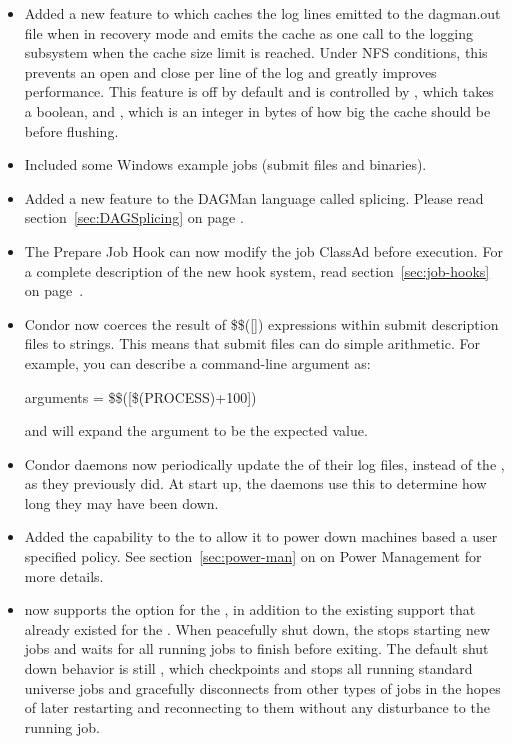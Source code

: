 \begin{itemize}

\item Added a new feature to  which caches the log lines
emitted to the dagman.out file when in recovery mode and emits the
cache as one call to the logging subsystem when the cache size limit is
reached. Under NFS conditions, this prevents an open and close per line
of the log and greatly improves performance. This feature is off by
default and is controlled by , which
takes a boolean, and  , which is an
integer in bytes of how big the cache should be before flushing.

\item Included some Windows example jobs (submit files and binaries).

\item Added a new feature to the DAGMan language called splicing. Please
read section~\ref{sec:DAGSplicing} on page \pageref{sec:DAGSplicing}.

\item The Prepare Job Hook can now modify the job ClassAd before execution.
For a complete description of the new hook system, read
section~\ref{sec:job-hooks} on page~\pageref{sec:job-hooks}.

\item Condor now coerces the result of \$\$([]) expressions within
submit description files to strings.
This means that submit files can do simple arithmetic.
For example, you can describe a command-line argument as:

arguments = \$\$([\$(PROCESS)+100])

and  will expand the argument to be the expected value.

\item Condor daemons now periodically update the  of their
  log files, instead of the , as they previously did.
  At start up, the daemons use this  
  to determine how long they may have been down.

\item Added the capability to the  to allow it to power 
  down machines based a user specified policy.  See 
  section~\ref{sec:power-man} on \pageref{sec:power-man} on
  Power Management for more details.

\item {} now supports the  option for the
  , in addition to the existing support that already existed for
  the .  When peacefully shut down,
  the  stops starting new
  jobs and waits for all running jobs to finish before exiting.  The
  default shut down behavior is still , which checkpoints
  and stops all running standard universe jobs and gracefully
  disconnects from other types of jobs in the hopes of later restarting
  and reconnecting to them without any disturbance to the running job.


\end{itemize}
